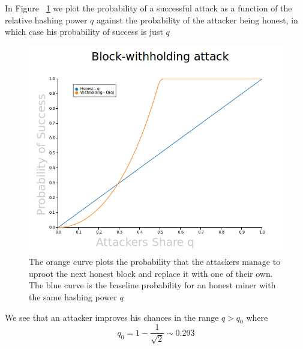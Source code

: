 \documentclass[letterpaper,12pt]{report}
\theoremstyle{plain}
\theoremstyle{definition}
\begin{document}
In Figure ~\ref{fig:PlotProbOfSuccess} we plot the probability of a successful attack as a function of the relative hashing power $q$ against the probability of the attacker being honest, in which case his probability of success is just $q$

\begin{figure}[pos]
\centering
\includegraphics[width=150mm]{Blockwithholdingattack.png}
\caption{The orange curve plots the probability that the attackers manage to uproot the next honest block and replace it with one of their own. The blue curve is the baseline probability for an honest miner with the same hashing power $q$}
\label{fig:PlotProbOfSuccess}
\end{figure}

We see that an attacker improves his chances in the range $q>q_0$ where
\begin{equation}\label{eqn:qnot}
q_0=1-\frac{1}{\sqrt{2}} \sim 0.293
\end{equation}
\end{document}
